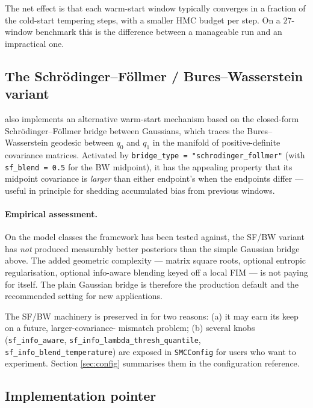 The net effect is that each warm-start window typically converges in
a fraction of the cold-start tempering steps, with a smaller HMC
budget per step. On a $27$-window benchmark this is the difference
between a manageable run and an impractical one.

\subsection{The Schr\"odinger--F\"ollmer / Bures--Wasserstein variant}

 also implements an alternative
warm-start mechanism based on the closed-form Schr\"odinger--F\"ollmer
bridge between Gaussians, which traces the Bures--Wasserstein geodesic
between $q_0$ and $q_1$ in the manifold of positive-definite
covariance matrices. Activated by \texttt{bridge\_type =
"schrodinger\_follmer"} (with \texttt{sf\_blend = 0.5} for the BW
midpoint), it has the appealing property that its midpoint covariance
is \emph{larger} than either endpoint's when the endpoints differ ---
useful in principle for shedding accumulated bias from previous
windows.

\paragraph{Empirical assessment.} On the model classes the framework
has been tested against, the SF/BW variant has \emph{not} produced
measurably better posteriors than the simple Gaussian bridge above.
The added geometric complexity --- matrix square roots, optional
entropic regularisation, optional info-aware blending keyed off a
local FIM --- is not paying for itself. The plain Gaussian bridge is
therefore the production default and the recommended setting for new
applications.

The SF/BW machinery is preserved in  for two
reasons: (a) it may earn its keep on a future, larger-covariance-
mismatch problem; (b) several knobs (\texttt{sf\_info\_aware},
\texttt{sf\_info\_lambda\_thresh\_quantile},
\texttt{sf\_info\_blend\_temperature}) are exposed in
\texttt{SMCConfig} for users who want to experiment. Section
\ref{sec:config} summarises them in the configuration reference.

\subsection{Implementation pointer}

